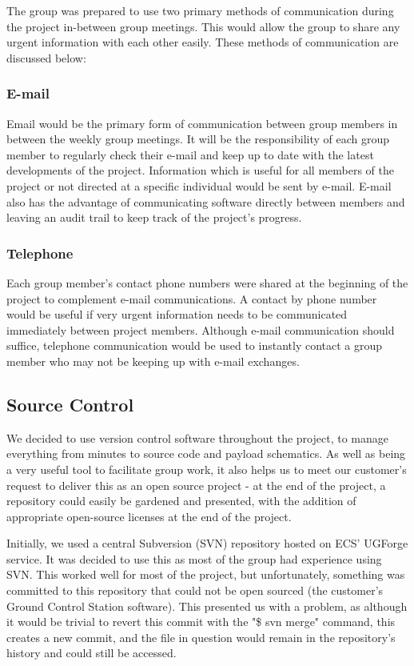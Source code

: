 The group was prepared to use two primary methods of communication during the project
in-between group meetings. This would allow the group to share any urgent information
with each other easily.
These methods of communication are discussed below:

\subsubsection{E-mail}

Email would be the primary form of communication between group members
in between the weekly group meetings. It will be the responsibility of each group
member to regularly check their e-mail and keep up to date with the latest 
developments of the project. Information which is useful for all members of the 
project or not directed at a specific individual would be sent by e-mail. E-mail also 
has the advantage of communicating software directly between members and leaving
an audit trail to keep track of the project's progress.

\subsubsection{Telephone}

Each group member's contact phone numbers were shared at the beginning of the
project to complement e-mail communications. A contact by phone number would
be useful if very urgent information needs to be communicated immediately between
project members. Although e-mail communication should suffice, telephone 
communication would be used to instantly contact a group member who may not
be keeping up with e-mail exchanges.

\subsection{Source Control}
\label{source control}
We decided to use version control software throughout the project, to manage 
everything from minutes to source code and payload schematics. As well as 
being a very useful tool to facilitate group work, it also helps us to meet 
our customer's request to deliver this as an open source project - at the end 
of the project, a repository could easily be gardened and presented, with the 
addition of appropriate open-source licenses at the end of the project.

Initially, we used a central Subversion (SVN) repository hosted on ECS' 
UGForge service. It was decided to use this as most of the group had 
experience using SVN. This worked well for most of the project, but 
unfortunately, something was committed to this repository that could not be 
open sourced (the customer's Ground Control Station software). This presented 
us with a problem, as although it would be trivial to revert this commit with 
the "\$ svn merge" command, this creates a new commit, and the file in 
question would remain in the repository's history and could still be accessed.

